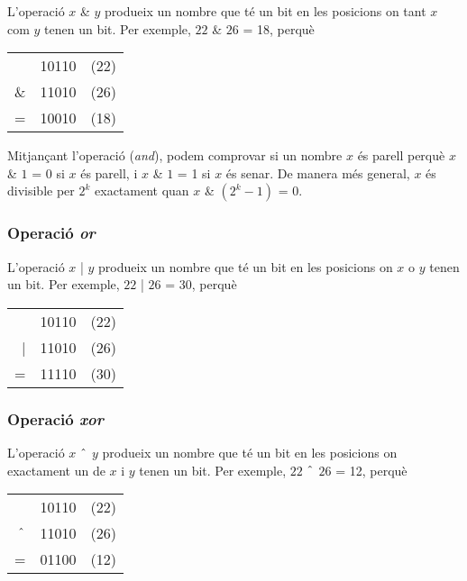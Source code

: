 
L'operació  $x$ \& $y$ produeix un nombre que té un
bit en les posicions on tant $x$ com $y$ tenen un bit. Per exemple, $22$
\& $26$ = 18, perquè


\begin{center}
\begin{tabular}{rrr}
& 10110 & (22)\\
\& & 11010 & (26) \\
\hline
 = & 10010 & (18) \\
\end{tabular}
\end{center}


Mitjançant l'operació (\emph{and}), podem comprovar si un nombre
$x$ és parell perquè $x$ \& $1$ = 0 si $x$ és parell, i $x$ \& $1$ = 1
si $x$ és senar. De manera més general, $x$ és divisible per $2^k$
exactament quan $x$ \& $(2^k-1)$ = 0.

\subsubsection{Operació \emph{or}}


L'operació  $x$ | $y$ produeix un nombre que té un bit
en les posicions on $x$ o $y$ tenen un bit. Per exemple, $22$ |
$26$ = 30, perquè


\begin{center}
\begin{tabular}{rrr}
& 10110 & (22)\\
| & 11010 & (26) \\
\hline
 = & 11110 & (30) \\
\end{tabular}
\end{center}


\subsubsection{Operació \emph{xor}}


L'operació  $x$ $\XOR$ $y$ produeix un nombre que té un bit
en les posicions on exactament un de $x$ i $y$ tenen un bit. Per exemple,
$22$ $\XOR$ $26$ = 12, perquè


\begin{center}
\begin{tabular}{rrr}
& 10110 & (22)\\
$\XOR$ & 11010 & (26) \\
\hline
 = & 01100 & (12) \\
\end{tabular}
\end{center}


